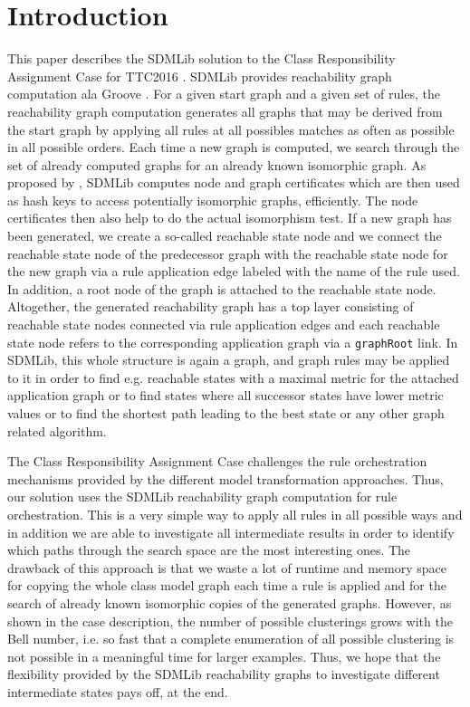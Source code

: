 \documentclass[submission,copyright,creativecommons]{eptcs}
\begin{document}
\section{Introduction}
\label{sec:intro}

This paper describes the SDMLib solution to the Class Responsibility Assignment Case for TTC2016
\cite{ttc2016-case}. SDMLib provides reachability graph computation ala Groove 
\cite{rensink2003groove}. For a given start graph and a given set of rules, 
the reachability graph computation generates all graphs that may be derived from 
the start graph by applying all rules at all 
possibles matches as often as possible in all possible orders. Each time a new graph is 
computed, we search through the set of already computed graphs for an already known 
isomorphic graph. As proposed by \cite{rensink2003groove}, SDMLib computes node and graph 
certificates which are then used as hash keys to access potentially isomorphic graphs, 
efficiently. The node certificates then also help to do the actual isomorphism test. If a new 
graph has been generated, we create a so-called reachable state 
node and we connect the reachable state node of the predecessor graph with the reachable 
state node for the new graph via a rule application edge labeled with the name of 
the rule used. In addition, a root node of the graph is attached to the reachable state node. 
Altogether, the generated reachability graph has a top layer consisting of reachable 
state nodes connected via rule application edges and each reachable state node refers to 
the corresponding application graph via a \texttt{graphRoot} link. In SDMLib, this whole 
structure is again a graph, and graph rules may be applied to it in order to find e.g. 
reachable states with a maximal metric for the attached application graph or to find states 
where all successor states have lower metric values or to find the shortest path leading to 
the best state or any other graph related algorithm.  

The Class Responsibility Assignment Case challenges the rule orchestration mechanisms 
provided by the different model transformation approaches. Thus, our solution uses the SDMLib 
reachability graph computation for rule orchestration. This is a very simple way to apply 
all rules in all possible ways and in addition we are able to investigate all intermediate 
results in order to identify which paths through the search space are the most interesting 
ones. The drawback of this approach is that we waste a lot of runtime and memory space 
for copying the whole class model graph each time a rule is applied and for the search of 
already known isomorphic copies of the generated graphs. However, as shown in the case 
description, the number of possible clusterings grows with the Bell number, i.e. so fast that 
a complete enumeration of all possible clustering is not possible in a meaningful time for 
larger examples. Thus, we hope that the flexibility provided by the SDMLib reachability graphs 
to investigate different intermediate states pays off, at the end. 
\end{document}
